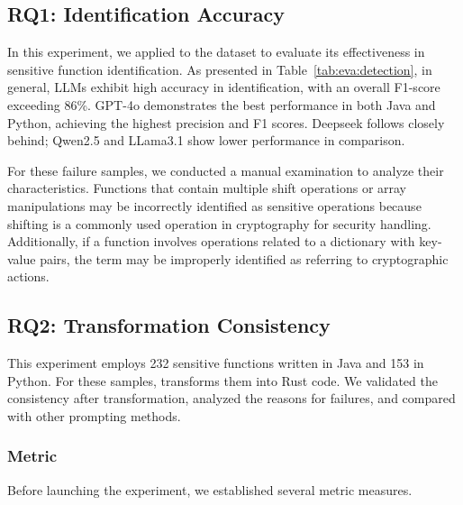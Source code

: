 \subsection{RQ1: Identification Accuracy}
In this experiment, we applied \system to the dataset to evaluate its effectiveness in sensitive function identification.
As presented in Table~\ref{tab:eva:detection}, in general, LLMs exhibit high accuracy in identification, with an overall F1-score exceeding 86\%.
GPT-4o demonstrates the best performance in both Java and Python, achieving the highest precision and F1 scores.
Deepseek follows closely behind; Qwen2.5 and LLama3.1 show lower performance in comparison.

For these failure samples, we conducted a manual examination to analyze their characteristics.
Functions that contain multiple shift operations or array manipulations may be incorrectly identified as sensitive operations because shifting is a commonly used operation in cryptography for security handling.
Additionally, if a function involves operations related to a dictionary with key-value pairs, the term  may be improperly identified as referring to cryptographic actions.



\subsection{RQ2: Transformation Consistency}
This experiment employs 232 sensitive functions written in Java and 153 in Python.
For these samples, \system transforms them into Rust code.
We validated the consistency after transformation, analyzed the reasons for failures, and compared \system with other prompting methods.

\subsubsection{Metric}
Before launching the experiment, we established several metric measures.

